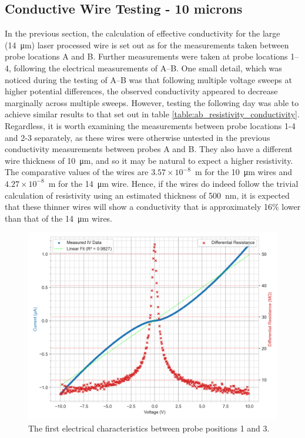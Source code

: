 \begin{refsection}
\subsection{Conductive Wire Testing - 10 microns}
\label{subsubsec:graphitised_wire_testing_10}
In the previous section, the calculation of effective conductivity for the large (14~\si{\micro\metre}) laser processed wire is set out as for the measurements taken between probe locations A and B. Further measurements were taken at probe locations 1--4, following the electrical measurements of A--B. One small detail, which was noticed during the testing of A--B was that following multiple voltage sweeps at higher potential differences, the observed conductivity appeared to decrease marginally across multiple sweeps. However, testing the following day was able to achieve similar results to that set out in table \ref{table:ab_resistivity_conductivity}. Regardless, it is worth examining the measurements between probe locations 1-4 and 2-3 separately, as these wires were otherwise untested in the previous conductivity measurements between probes A and B. They also have a different wire thickness of 10~\si{\micro\metre}, and so it may be natural to expect a higher resistivity. The comparative values of the wires are $3.57\times10^{-8}$~\si{\metre} for the 10~\si{\micro\metre} wires and $4.27\times10^{-8}$~\si{\metre} for the 14~\si{\micro\metre} wire. Hence, if the wires do indeed follow the trivial calculation of resistivity using an estimated thickness of 500~\si{\nano\metre}, it is expected that these thinner wires will show a conductivity that is approximately 16\% lower than that of the 14~\si{\micro\metre} wires.

\begin{figure}[H]
    \centering
    \includegraphics[width=\linewidth]{Chapter7/Figs/Raster/10V 13 d.png}
    \caption{The first electrical characteristics between probe positions 1 and 3.}
    \label{fig:10v_13}
\end{figure}


\end{refsection}
